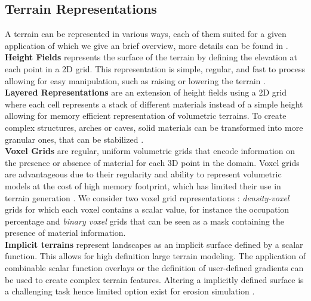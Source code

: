 \subsection{Terrain Representations}
A terrain can be represented in various ways, each of them suited for a given application of which we give an brief overview, more details can be found in \cite{Galin2019}.\\
\textbf{Height Fields} represents the surface of the terrain by defining the elevation at each point in a 2D grid. This representation is simple, regular, and fast to process allowing for easy manipulation, such as raising or lowering the terrain \cite{Gain2009, Emilien2015}.\\
\textbf{Layered Representations} are an extension of height fields using a 2D grid where each cell represents a stack of different materials instead of a simple height \cite{Peytavie2009, Benes2001} allowing for memory efficient representation of volumetric terrains. To create complex structures, arches or caves, solid materials can be transformed into more granular ones, that can be stabilized \cite{Peytavie2009}.\\
\textbf{Voxel Grids} are regular, uniform volumetric grids that encode information on the presence or absence of material for each 3D point in the domain. Voxel grids are advantageous due to their regularity \cite{Dey2018} and ability to represent volumetric models at the cost of high memory footprint, which has limited their use in terrain generation \cite{Ito2003, Kaufman1993, Lengyel2010a}. We consider two voxel grid representations : \textit{density-voxel} grids for which each voxel contains a scalar value, for instance the occupation percentage \cite{Eisemann2008}  and \textit{binary voxel} grids that can be seen as a mask containing the presence of material information.\\
\textbf{Implicit terrains} represent landscapes as an implicit surface defined by a scalar function. This allows for high definition large terrain modeling. The application of combinable scalar function overlays \cite{Guerin2016a} or the definition of user-defined gradients \cite{Guerin2022} can be used to create complex terrain features. Altering a implicitly defined surface is a challenging task hence limited option exist for erosion simulation \cite{Paris2019}.

